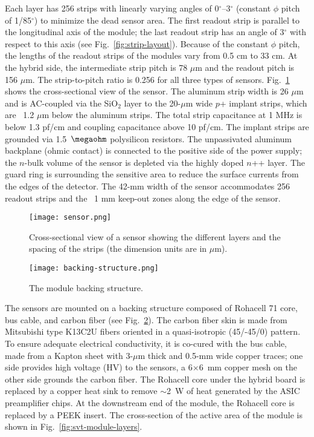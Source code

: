 Each layer has 256 strips with linearly varying angles of 0$^\circ$--3$^\circ$ (constant $\phi$ pitch of 1/85$^\circ$) to minimize the dead sensor area. The first readout strip is parallel to the longitudinal axis of the module; the last readout strip has an angle of 3$^\circ$ with respect to this axis (see Fig.~\ref{fig:strip-layout}). Because of the constant $\phi$ pitch, the lengths of the readout strips of the modules vary from 0.5 cm to 33 cm. At the hybrid side, the intermediate strip pitch is 78 $\mu$m and the readout pitch is 156 $\mu$m. The strip-to-pitch ratio is 0.256 for all three types of sensors. Fig.~\ref{fig:sensor} shows the cross-sectional view of the sensor. The aluminum strip width is 26 $\mu$m and is AC-coupled via the SiO$_2$ layer to the 20-$\mu$m wide $p$+ implant strips, which are ~1.2 $\mu$m below the aluminum strips. The total strip capacitance at 1 MHz is below 1.3 pf/cm and coupling capacitance above 10 pf/cm. The implant strips are grounded via 1.5~$\megaohm$ polysilicon resistors. The unpassivated aluminum backplane (ohmic contact) is connected to the positive side of the power supply; the $n$-bulk volume of the sensor is depleted via the highly doped $n$++ layer. The guard ring is surrounding the sensitive area to reduce the surface currents from the edges of the detector. The 42-mm width of the sensor accommodates 256 readout strips and the ~1 mm keep-out zones along the edge of the sensor.

\begin{figure}[hbt] 
\centering 
\texttt{[image: sensor.png]}
\caption{Cross-sectional view of a sensor showing the different layers and the spacing of the strips (the dimension units are in $\mu$m).}
\label{fig:sensor}
\end{figure}

\begin{figure}[hbt] 
\centering 
\texttt{[image: backing-structure.png]}
\caption{The module backing structure.}
\label{fig:backing-structure}
\end{figure}

The sensors are mounted on a backing structure composed of Rohacell 71 core, bus cable, and carbon fiber (see Fig.~\ref{fig:backing-structure}). The carbon fiber skin is made from Mitsubishi type K13C2U fibers oriented in a quasi-isotropic (45/-45/0) pattern. To ensure adequate electrical conductivity, it is co-cured with the bus cable, made from a Kapton sheet with 3-$\mu$m thick and 0.5-mm wide copper traces; one side provides high voltage (HV) to the sensors, a 6$\times$6~mm copper mesh on the other side grounds the carbon fiber.  The Rohacell core under the hybrid board is replaced by a copper heat sink to remove $\sim$2~W of heat generated by the ASIC preamplifier chips. At the downstream end of the module, the Rohacell core is replaced by a PEEK insert. The cross-section of the active area of the module is shown in Fig.~\ref{fig:svt-module-layers}. 

